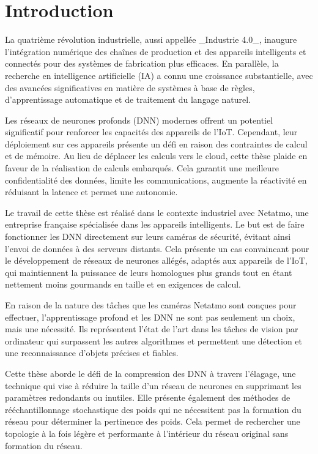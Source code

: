 \section{Introduction}

La quatrième révolution industrielle, aussi appellée _Industrie 4.0_, inaugure
l'intégration numérique des chaînes de production et des appareils intelligents
et connectés pour des systèmes de fabrication plus efficaces. En parallèle, la
recherche en intelligence artificielle (IA) a connu une croissance
substantielle, avec des avancées significatives en matière de systèmes à base de
règles, d'apprentissage automatique et de traitement du langage naturel. 

Les réseaux de neurones profonds (DNN) modernes offrent un potentiel
significatif pour renforcer les capacités des appareils de l'IoT. Cependant,
leur déploiement sur ces appareils présente un défi en raison des contraintes de
calcul et de mémoire. Au lieu de déplacer les calculs vers le cloud, cette thèse
plaide en faveur de la réalisation de calculs embarqués. Cela garantit une
meilleure confidentialité des données, limite les communications, augmente la
réactivité en réduisant la latence et permet une autonomie.

Le travail de cette thèse est réalisé dans le contexte industriel avec Netatmo,
une entreprise française spécialisée dans les appareils intelligents. Le but est
de faire fonctionner les DNN directement sur leurs caméras de sécurité, évitant
ainsi l'envoi de données à des serveurs distants. Cela présente un cas
convaincant pour le développement de réseaux de neurones allégés, adaptés aux
appareils de l'IoT, qui maintiennent la puissance de leurs homologues plus
grands tout en étant nettement moins gourmands en taille et en exigences de
calcul.

En raison de la nature des tâches que les caméras Netatmo sont conçues pour
effectuer, l'apprentissage profond et les DNN ne sont pas seulement un choix,
mais une nécessité. Ils représentent l'état de l'art dans les tâches de vision
par ordinateur qui surpassent les autres algorithmes et permettent une détection
et une reconnaissance d'objets précises et fiables.

Cette thèse aborde le défi de la compression des DNN à travers l'élagage, une
technique qui vise à réduire la taille d'un réseau de neurones en supprimant les
paramètres redondants ou inutiles. Elle présente également des méthodes de
rééchantillonnage stochastique des poids qui ne nécessitent pas la formation du
réseau pour déterminer la pertinence des poids. Cela permet de rechercher une
topologie à la fois légère et performante à l'intérieur du réseau original sans
formation du réseau.
